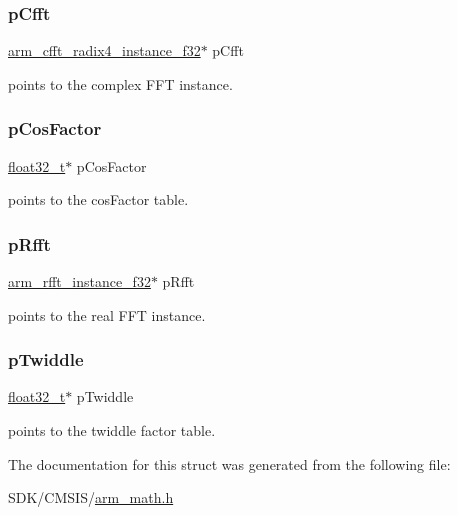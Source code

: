 \subsubsection{\texorpdfstring{p\+Cfft}{pCfft}}
{\footnotesize\ttfamily \mbox{\hyperlink{structarm__cfft__radix4__instance__f32}{arm\+\_\+cfft\+\_\+radix4\+\_\+instance\+\_\+f32}}$\ast$ p\+Cfft}

points to the complex F\+FT instance. \mbox{\label{structarm__dct4__instance__f32_abd73b9d7fb4951ba086e4820c2a48eb0}} 
\subsubsection{\texorpdfstring{p\+Cos\+Factor}{pCosFactor}}
{\footnotesize\ttfamily \mbox{\hyperlink{arm__math_8h_a4611b605e45ab401f02cab15c5e38715}{float32\+\_\+t}}$\ast$ p\+Cos\+Factor}

points to the cos\+Factor table. \mbox{\label{structarm__dct4__instance__f32_ad4cd7c85eea3f7c5fff4630bbd979e6a}} 
\subsubsection{\texorpdfstring{p\+Rfft}{pRfft}}
{\footnotesize\ttfamily \mbox{\hyperlink{structarm__rfft__instance__f32}{arm\+\_\+rfft\+\_\+instance\+\_\+f32}}$\ast$ p\+Rfft}

points to the real F\+FT instance. \mbox{\label{structarm__dct4__instance__f32_aca581481fccdff0f557f54a3ef20d967}} 
\subsubsection{\texorpdfstring{p\+Twiddle}{pTwiddle}}
{\footnotesize\ttfamily \mbox{\hyperlink{arm__math_8h_a4611b605e45ab401f02cab15c5e38715}{float32\+\_\+t}}$\ast$ p\+Twiddle}

points to the twiddle factor table. 

The documentation for this struct was generated from the following file\+:\begin{DoxyCompactItemize}
\item 
S\+D\+K/\+C\+M\+S\+I\+S/\mbox{\hyperlink{arm__math_8h}{arm\+\_\+math.\+h}}\end{DoxyCompactItemize}

